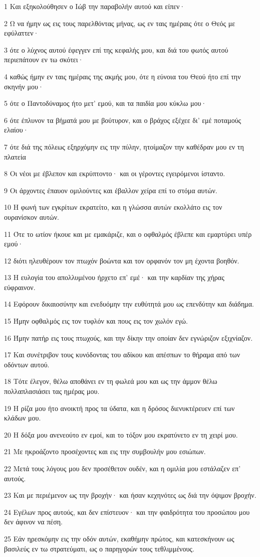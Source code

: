\par 1 Και εξηκολούθησεν ο Ιώβ την παραβολήν αυτού και είπεν·
\par 2 Ω να ήμην ως εις τους παρελθόντας μήνας, ως εν ταις ημέραις ότε ο Θεός με εφύλαττεν·
\par 3 ότε ο λύχνος αυτού έφεγγεν επί της κεφαλής μου, και διά του φωτός αυτού περιεπάτουν εν τω σκότει·
\par 4 καθώς ήμην εν ταις ημέραις της ακμής μου, ότε η εύνοια του Θεού ήτο επί την σκηνήν μου·
\par 5 ότε ο Παντοδύναμος ήτο μετ' εμού, και τα παιδία μου κύκλω μου·
\par 6 ότε έπλυνον τα βήματά μου με βούτυρον, και ο βράχος εξέχεε δι' εμέ ποταμούς ελαίου·
\par 7 ότε διά της πόλεως εξηρχόμην εις την πύλην, ητοίμαζον την καθέδραν μου εν τη πλατεία
\par 8 Οι νέοι με έβλεπον και εκρύπτοντο· και οι γέροντες εγειρόμενοι ίσταντο.
\par 9 Οι άρχοντες έπαυον ομιλούντες και έβαλλον χείρα επί το στόμα αυτών.
\par 10 Η φωνή των εγκρίτων εκρατείτο, και η γλώσσα αυτών εκολλάτο εις τον ουρανίσκον αυτών.
\par 11 Ότε το ωτίον ήκουε και με εμακάριζε, και ο οφθαλμός έβλεπε και εμαρτύρει υπέρ εμού·
\par 12 διότι ηλευθέρουν τον πτωχόν βοώντα και τον ορφανόν τον μη έχοντα βοηθόν.
\par 13 Η ευλογία του απολλυμένου ήρχετο επ' εμέ· και την καρδίαν της χήρας εύφραινον.
\par 14 Εφόρουν δικαιοσύνην και ενεδυόμην την ευθύτητά μου ως επενδύτην και διάδημα.
\par 15 Ήμην οφθαλμός εις τον τυφλόν και πους εις τον χωλόν εγώ.
\par 16 Ήμην πατήρ εις τους πτωχούς, και την δίκην την οποίαν δεν εγνώριζον εξιχνίαζον.
\par 17 Και συνέτριβον τους κυνόδοντας του αδίκου και απέσπων το θήραμα από των οδόντων αυτού.
\par 18 Τότε έλεγον, θέλω αποθάνει εν τη φωλεά μου και ως την άμμον θέλω πολλαπλασιάσει τας ημέρας μου.
\par 19 Η ρίζα μου ήτο ανοικτή προς τα ύδατα, και η δρόσος διενυκτέρευεν επί των κλάδων μου.
\par 20 Η δόξα μου ανενεούτο εν εμοί, και το τόξον μου εκρατύνετο εν τη χειρί μου.
\par 21 Με ηκροάζοντο προσέχοντες και εις την συμβουλήν μου εσιώπων.
\par 22 Μετά τους λόγους μου δεν προσέθετον ουδέν, και η ομιλία μου εστάλαζεν επ' αυτούς.
\par 23 Και με περιέμενον ως την βροχήν· και ήσαν κεχηνότες ως διά την όψιμον βροχήν.
\par 24 Εγέλων προς αυτούς, και δεν επίστευον· και την φαιδρότητα του προσώπου μου δεν άφινον να πέση.
\par 25 Εάν ηρεσκόμην εις την οδόν αυτών, εκαθήμην πρώτος, και κατεσκήνουν ως βασιλεύς εν τω στρατεύματι, ως ο παρηγορών τους τεθλιμμένους.

